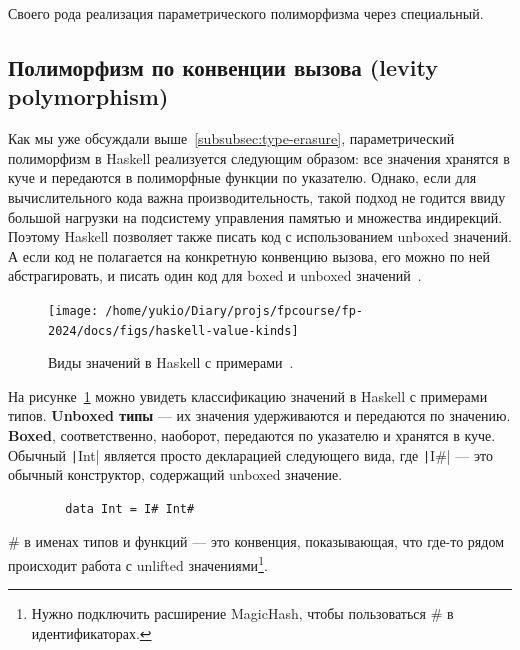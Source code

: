 \documentclass[12pt]{article}
\newcommand{\vocab}[1]{\textbf{#1}} %
\begin{document}
    Своего рода реализация параметрического полиморфизма через специальный.

    \subsection{Полиморфизм по конвенции вызова (levity polymorphism)} \label{subsec:levity-polymorphism}


    Как мы уже обсуждали выше~\ref{subsubsec:type-erasure}, параметрический полиморфизм в Haskell реализуется следующим образом: все значения хранятся в куче и передаются в полиморфные функции по указателю.
    Однако, если для вычислительного кода важна производительность, такой подход не годится ввиду большой нагрузки на подсистему управления памятью и множества индирекций.
    Поэтому Haskell позволяет также писать код с использованием unboxed значений.
    А если код не полагается на конкретную конвенцию вызова, его можно по ней абстрагировать, и писать один код для boxed и unboxed значений~\cite{eisenberg2017levity}.

    \begin{figure}[h]
        \centering
        \texttt{[image: /home/yukio/Diary/projs/fpcourse/fp-2024/docs/figs/haskell-value-kinds]}
        \caption{Виды значений в Haskell с примерами~\cite{eisenberg2017levity}.}
        \label{fig:haskell-value-kinds}
    \end{figure}

    На рисунке~\ref{fig:haskell-value-kinds} можно увидеть классификацию значений в Haskell с примерами типов.
    \vocab{Unboxed типы} --- их значения удерживаются и передаются по значению.
    \vocab{Boxed}, соответственно, наоборот, передаются по указателю и хранятся в куче.
    Обычный \texttt|Int| является просто декларацией следующего вида, где \texttt|I#| --- это обычный конструктор, содержащий unboxed значение.
    \begin{verbatim}
        data Int = I# Int#
    \end{verbatim}


    \# в именах типов и функций --- это конвенция, показывающая, что где-то рядом происходит работа с unlifted значениями\footnote{Нужно подключить расширение MagicHash, чтобы пользоваться \# в идентификаторах.}.

\end{document}

